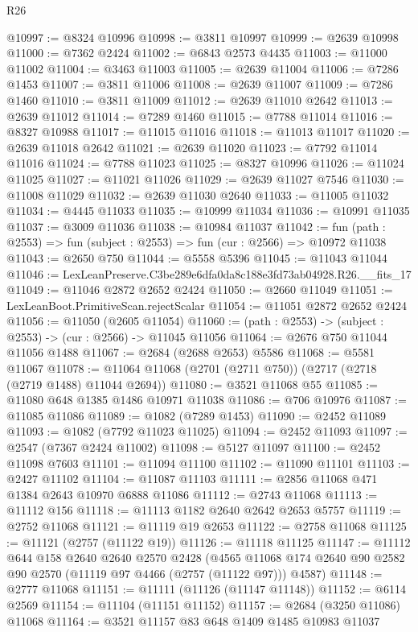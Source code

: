 \begin{lexlean}{R26}
\begin{coremodule}
@10997 := @8324 @10996
@10998 := @3811 @10997
@10999 := @2639 @10998
@11000 := @7362 @2424
@11002 := @6843 @2573 @4435
@11003 := @11000 @11002
@11004 := @3463 @11003
@11005 := @2639 @11004
@11006 := @7286 @1453
@11007 := @3811 @11006
@11008 := @2639 @11007
@11009 := @7286 @1460
@11010 := @3811 @11009
@11012 := @2639 @11010 @2642
@11013 := @2639 @11012
@11014 := @7289 @1460
@11015 := @7788 @11014
@11016 := @8327 @10988
@11017 := @11015 @11016
@11018 := @11013 @11017
@11020 := @2639 @11018 @2642
@11021 := @2639 @11020
@11023 := @7792 @11014 @11016
@11024 := @7788 @11023
@11025 := @8327 @10996
@11026 := @11024 @11025
@11027 := @11021 @11026
@11029 := @2639 @11027 @7546
@11030 := @11008 @11029
@11032 := @2639 @11030 @2640
@11033 := @11005 @11032
@11034 := @4445 @11033
@11035 := @10999 @11034
@11036 := @10991 @11035
@11037 := @3009 @11036
@11038 := @10984 @11037
@11042 := fun (path : @2553) => fun (subject : @2553) => fun (cur : @2566) => @10972 @11038
@11043 := @2650 @750
@11044 := @5558 @5396
@11045 := @11043 @11044
@11046 := LexLeanPreserve.C3be289e6dfa0da8c188e3fd73ab04928.R26.__fits_17
@11049 := @11046 @2872 @2652 @2424
@11050 := @2660 @11049
@11051 := LexLeanBoot.PrimitiveScan.rejectScalar
@11054 := @11051 @2872 @2652 @2424
@11056 := @11050 (@2605 @11054)
@11060 := (path : @2553) -> (subject : @2553) -> (cur : @2566) -> @11045 @11056
@11064 := @2676 @750 @11044 @11056 @1488
@11067 := @2684 (@2688 @2653) @5586
@11068 := @5581 @11067
@11078 := @11064 @11068 (@2701 (@2711 @750)) (@2717 (@2718 (@2719 @1488) @11044 @2694))
@11080 := @3521 @11068 @55
@11085 := @11080 @648 @1385 @1486 @10971 @11038
@11086 := @706 @10976
@11087 := @11085 @11086
@11089 := @1082 (@7289 @1453)
@11090 := @2452 @11089
@11093 := @1082 (@7792 @11023 @11025)
@11094 := @2452 @11093
@11097 := @2547 (@7367 @2424 @11002)
@11098 := @5127 @11097
@11100 := @2452 @11098 @7603
@11101 := @11094 @11100
@11102 := @11090 @11101
@11103 := @2427 @11102
@11104 := @11087 @11103
@11111 := @2856 @11068 @471 @1384 @2643 @10970 @6888 @11086
@11112 := @2743 @11068
@11113 := @11112 @156
@11118 := @11113 @1182 @2640 @2642 @2653 @5757
@11119 := @2752 @11068
@11121 := @11119 @19 @2653
@11122 := @2758 @11068
@11125 := @11121 (@2757 (@11122 @19))
@11126 := @11118 @11125
@11147 := @11112
    @644
    @158
    @2640
    @2640
    @2570
    @2428
    (@4565 @11068 @174 @2640 @90 @2582 @90 @2570 (@11119 @97 @4466 (@2757 (@11122 @97))) @4587)
@11148 := @2777 @11068
@11151 := @11111 (@11126 (@11147 @11148))
@11152 := @6114 @2569
@11154 := @11104 (@11151 @11152)
@11157 := @2684 (@3250 @11086) @11068
@11164 := @3521 @11157 @83 @648 @1409 @1485 @10983 @11037

\end{coremodule}
\end{lexlean}
